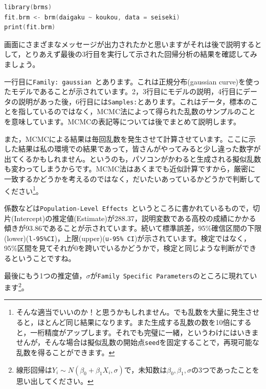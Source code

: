 \documentclass{ltjsarticle}
\begin{document}
\begin{lstlisting}[language=c++,label={code:27_04},caption={ベイズ推定してみる}]
library(brms)
fit.brm <- brm(daigaku ~ koukou, data = seiseki)
print(fit.brm)
\end{lstlisting}

画面にさまざまなメッセージが出力されたかと思いますがそれは後で説明するとして，とりあえず最後の3行目を実行して示された回帰分析の結果を確認してみましょう。

一行目に\texttt{Family: gaussian }とあります。これは正規分布(gaussian curve)を使ったモデルであることが示されています。2，3行目にモデルの説明，4行目にデータの説明があった後，6行目には\texttt{Samples:}とあります。これはデータ，標本のことを指しているのではなく，MCMC法によって得られた乱数のサンプルのことを意味しています。MCMCの表記等については後でまとめて説明します。

また，MCMCによる結果は毎回乱数を発生させて計算させています。ここに示した結果は私の環境での結果であって，皆さんがやってみると少し違った数字が出てくるかもしれません。というのも，パソコンがかわると生成される擬似乱数も変わってしまうからです。MCMC法はあくまでも近似計算ですから，厳密に一致するかどうかを考えるのではなく，だいたいあっているかどうかで判断してください\footnote{そんな適当でいいのか！と思うかもしれません。でも乱数を大量に発生させると，ほとんど同じ結果になります。また生成する乱数の数を10倍にすると，一桁精度がアップします。それでも完璧に一緒，というわけにはいきませんが，そんな場合は擬似乱数の開始点\texttt{seed}を固定することで，再現可能な乱数を得ることができます。}。

係数などは\texttt{Population-Level Effects }というところに書かれているもので，切片(Intercept)の推定値(Estimate)が288.37，説明変数である高校の成績にかかる傾きが93.86であることが示されています。続いて標準誤差，95\%確信区間の下限(lower)(\texttt{l-95\%CI})，上限(upper)(\texttt{u-95\% CI})が示されています。検定ではなく，95\%区間を見てそれが0を跨いでいるかどうかで，検定と同じような判断ができるということですね。

最後にもう1つの推定値，$\sigma$が\texttt{Family Specific Parameters}のところに現れています\footnote{線形回帰は$Y_i \sim N(\beta_0 + \beta_1 X_i , \sigma)$で，未知数は$\beta_0,\beta_1,\sigma$の3つであったことを思い出してください。}。
\end{document}
